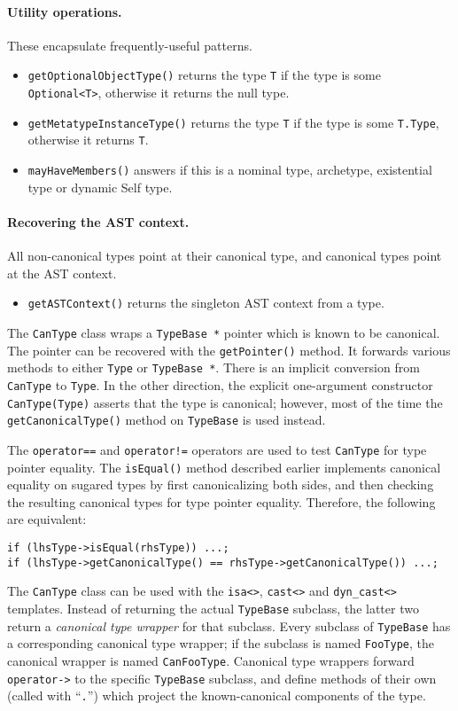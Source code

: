 \documentclass[../generics]{subfiles}
\begin{document}
\paragraph{Utility operations.} These encapsulate frequently-useful patterns.
\begin{itemize}
\item \texttt{getOptionalObjectType()} returns the type \texttt{T} if the type is some \texttt{Optional<T>}, otherwise it returns the null type.
\item \texttt{getMetatypeInstanceType()} returns the type \texttt{T} if the type is some \texttt{T.Type}, otherwise it returns \texttt{T}.
\item \texttt{mayHaveMembers()} answers if this is a nominal type, archetype, existential type or dynamic Self type.
\end{itemize}

\paragraph{Recovering the AST context.} All non-canonical types point at their canonical type, and canonical types point at the AST context.
\begin{itemize}
\item \texttt{getASTContext()} returns the singleton AST context from a type.
\end{itemize}

The \texttt{CanType} class wraps a \texttt{TypeBase *} pointer which is known to be canonical. The pointer can be recovered with the \texttt{getPointer()} method. It forwards various methods to either \texttt{Type} or \texttt{TypeBase~*}. There is an implicit conversion from \texttt{CanType} to \texttt{Type}. In the other direction, the explicit one-argument constructor \texttt{CanType(Type)} asserts that the type is canonical; however, most of the time the \texttt{getCanonicalType()} method on \texttt{TypeBase} is used instead.

The \texttt{operator==} and \texttt{operator!=} operators are used to test \texttt{CanType} for type pointer equality. The \texttt{isEqual()} method described earlier implements canonical equality on sugared types by first canonicalizing both sides, and then checking the resulting canonical types for type pointer equality. Therefore, the following are equivalent:
\begin{Verbatim}
if (lhsType->isEqual(rhsType)) ...;
if (lhsType->getCanonicalType() == rhsType->getCanonicalType()) ...;
\end{Verbatim}
The \texttt{CanType} class can be used with the \verb|isa<>|, \verb|cast<>| and \verb|dyn_cast<>| templates. Instead of returning the actual \texttt{TypeBase} subclass, the latter two return a \emph{canonical type wrapper} for that subclass. Every subclass of \texttt{TypeBase} has a corresponding canonical type wrapper; if the subclass is named \texttt{FooType}, the canonical wrapper is named \texttt{CanFooType}. Canonical type wrappers forward \texttt{operator->} to the specific \texttt{TypeBase} subclass, and define methods of their own (called with ``\texttt{.}'') which project the known-canonical components of the type.
\end{document}
